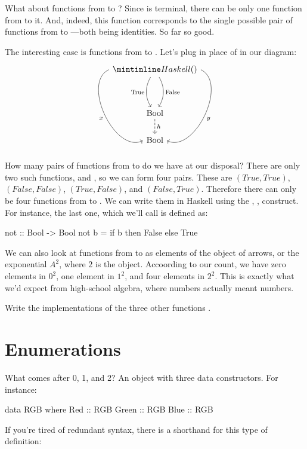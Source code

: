 \documentclass[DaoFP]{subfiles}
\begin{document}
What about functions from  to \hask{()}? Since \hask{()} is terminal, there can be only one function from  to it. And, indeed, this function corresponds to the single possible pair of functions from \hask{()} to \hask{()}---both being identities. So far so good.

The interesting case is functions from  to . Let's plug  in place of  in our diagram:
\[
 \begin{tikzcd}
 \hask{()}
 \arrow[dd, bend right, "\text{True}"']
 \arrow[dd, bend left, "\text{False}"]
  \arrow[ddd, bend right =90, "x"']
 \arrow[ddd, bend left=90, "y"]
\\
 \\
\text{Bool}
\arrow[d, dashed, "h"]
\\
\text{Bool}
 \end{tikzcd}
\]
How many pairs of functions from \hask{()} to  do we have at our disposal? There are only two such functions,  and , so we can form four pairs. These are $(True, True)$, $(False, False)$, $(True, False)$, and $(False, True)$. Therefore there can only be four functions from  to . We can write them in Haskell using the  , ,  construct. For instance, the last one, which we'll call  is defined as:
\begin{haskell}
not :: Bool -> Bool
not b = if b then False else True
\end{haskell}

We can also look at functions from  to  as elements of the object of arrows, or the exponential $A^2$, where $2$ is the  object. Accoording to our count, we have zero elements in $0^2$, one element in $1^2$, and four elements in $2^2$. This is exactly what we'd expect from high-school algebra, where numbers actually meant numbers.

\begin{exercise}
Write the implementations of the three other functions .
\end{exercise}

\section{Enumerations}

What comes after 0, 1, and 2? An object with three data constructors. For instance:
\begin{haskell}
data RGB where
  Red   :: RGB
  Green :: RGB
  Blue  :: RGB
\end{haskell}
If you're tired of redundant syntax, there is a shorthand for this type of definition:
\end{document}
